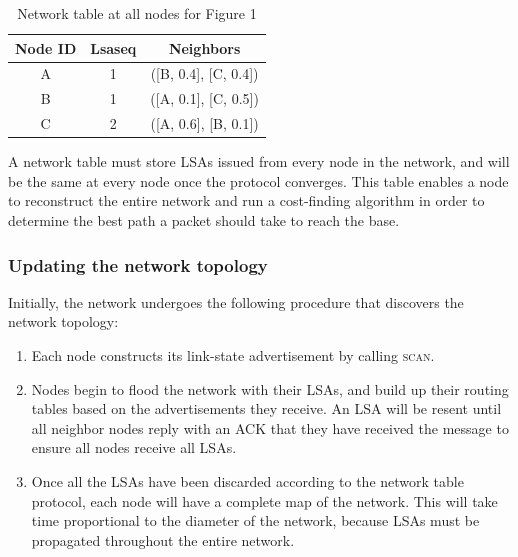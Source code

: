 \documentclass[letterpaper]{article}
\begin{document}
\begin{table}[ht]
\caption{Network table at all nodes for Figure 1} %
\centering %
\begin{tabular}{c c c} %
\hline
\hline %
Node ID & Lsaseq & Neighbors  \\[0.5ex] %
\hline %
A & 1 & ([B, 0.4], [C, 0.4])\\
B & 1 & ([A, 0.1], [C, 0.5])\\
C & 2 & ([A, 0.6], [B, 0.1])\\ [1ex]
\hline
\end{tabular}
\label{table:nonlin}
\end{table}


\noindent A network table must store LSAs issued from every node in the network, and will be the same
at every node once the protocol converges. This table enables a node to reconstruct the entire network
and run a cost-finding algorithm in order to determine the best path a packet should take to reach the
base.

\subsubsection{Updating the network topology}

\noindent Initially, the network undergoes the following procedure that discovers the network topology:

\begin{enumerate}
  \item Each node constructs its link-state advertisement by calling \textsc{scan}. 
  \item Nodes begin to flood the network with their LSAs, and build up their routing tables based on
  the advertisements they receive. An LSA will be resent until all neighbor nodes reply with an ACK
  that they have received the message to ensure all nodes receive all LSAs.
  \item Once all the LSAs have been discarded according to the network table protocol, each node will have
  a complete map of the network. This will take time proportional to the diameter of the network, because
  LSAs must be propagated throughout the entire network.
\end{enumerate}
\end{document}
